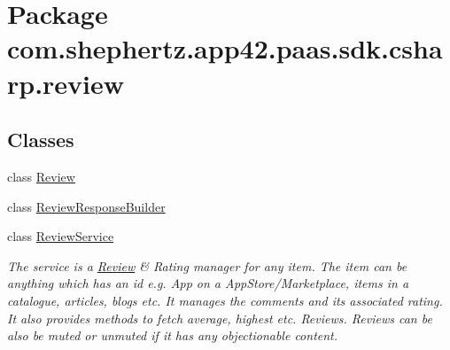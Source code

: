 \hypertarget{namespacecom_1_1shephertz_1_1app42_1_1paas_1_1sdk_1_1csharp_1_1review}{\section{Package com.\+shephertz.\+app42.\+paas.\+sdk.\+csharp.\+review}
\label{namespacecom_1_1shephertz_1_1app42_1_1paas_1_1sdk_1_1csharp_1_1review}
}
\subsection*{Classes}
\begin{DoxyCompactItemize}
\item 
class \hyperlink{classcom_1_1shephertz_1_1app42_1_1paas_1_1sdk_1_1csharp_1_1review_1_1_review}{Review}
\item 
class \hyperlink{classcom_1_1shephertz_1_1app42_1_1paas_1_1sdk_1_1csharp_1_1review_1_1_review_response_builder}{Review\+Response\+Builder}
\item 
class \hyperlink{classcom_1_1shephertz_1_1app42_1_1paas_1_1sdk_1_1csharp_1_1review_1_1_review_service}{Review\+Service}
\begin{DoxyCompactList}\small\item\em The service is a \hyperlink{classcom_1_1shephertz_1_1app42_1_1paas_1_1sdk_1_1csharp_1_1review_1_1_review}{Review} \& Rating manager for any item. The item can be anything which has an id e.\+g. App on a App\+Store/\+Marketplace, items in a catalogue, articles, blogs etc. It manages the comments and its associated rating. It also provides methods to fetch average, highest etc. Reviews. Reviews can be also be muted or unmuted if it has any objectionable content. \end{DoxyCompactList}\end{DoxyCompactItemize}
